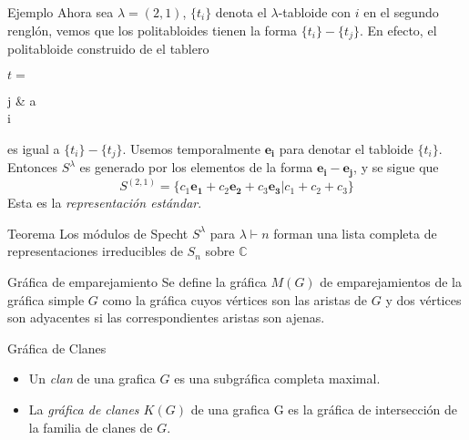 \documentclass[final,xcolor=svgnames]{beamer}
\begin{document}
\begin{frame}{}
\begin{columns}
\begin{column}{0.5\textwidth}
\begin{block}{Ejemplo}
         Ahora sea $\lambda=(2,1)$, $\{t_{i}\}$ denota el $\lambda$-tabloide
         con $i$ en el segundo renglón, vemos que los politabloides tienen la
         forma  $\{t_{i}\}- \{t_{j}\}$. En efecto, el politabloide construido
         de el tablero
         \begin{center}$t=$
           \begin{ytableau}
             j & a \\
             i\\
           \end{ytableau}
         \end{center}
         es igual a $\{t_{i}\}- \{t_{j}\}$. Usemos temporalmente
         $\boldsymbol{e_{i}}$ para denotar el tabloide $\{t_{i}\}$. Entonces
         $S^{\lambda}$ es generado por los elementos de la forma
         $\boldsymbol{e_{i}}-\boldsymbol{e_{j}}$, y se sigue que
         $$S^{(2,1)}=\{c_{1}\boldsymbol{e_{1}}+c_{2}\boldsymbol{e_{2}}+c_{3}\boldsymbol{e_{3}}|c_{1}+c_{2}+c_{3}\}$$ 
         Esta es la \textit{representación estándar}. 
     \end{block}

     \begin{block}{Teorema}
         Los módulos de Specht $S^{\lambda}$ para $\lambda\vdash n$ forman
         una lista completa de representaciones irreducibles de $S_{n}$ sobre $\mathbb{C}$
      \end{block}

      \begin{block}{Gráfica de emparejamiento}
        Se define la gráfica $M(G)$ de emparejamientos de la gráfica
        simple $G$ como la gráfica cuyos vértices son las aristas de
        $G$ y dos vértices son adyacentes si las correspondientes
        aristas son ajenas. %
      \end{block}


      \begin{block}{Gráfica de Clanes}
        \begin{itemize}
        \item Un \textit{clan} de una grafica $G$ es una subgráfica completa maximal. 
        \item La \textit{gráfica de clanes $K(G)$} de una grafica G es la gráfica de intersección de
          la familia de clanes de $G$.   
        \end{itemize}


\end{block}
\end{column}
\end{columns}
\end{frame}
\end{document}
